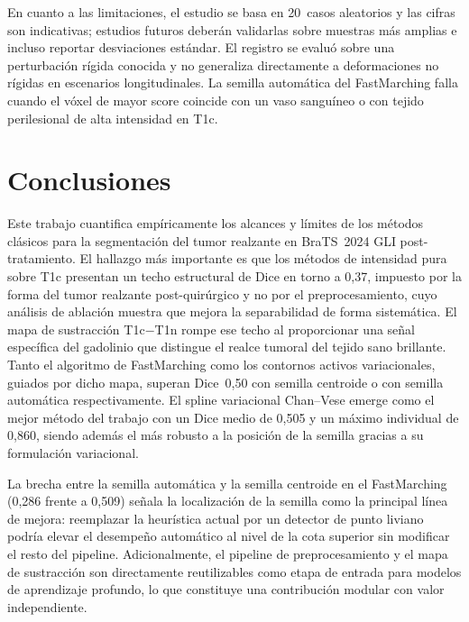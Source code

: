 \documentclass[conference]{IEEEtran}
\begin{document}
En cuanto a las limitaciones, el estudio se basa en 20~casos
aleatorios y las cifras son indicativas; estudios futuros
deber\'{a}n validarlas sobre muestras m\'{a}s amplias e incluso
reportar desviaciones est\'{a}ndar.
El registro se evalu\'{o} sobre una perturbaci\'{o}n r\'{i}gida
conocida y no generaliza directamente a deformaciones no
r\'{i}gidas en escenarios longitudinales.
La semilla autom\'{a}tica del FastMarching falla cuando el
v\'{o}xel de mayor score coincide con un vaso sangu\'{i}neo o con
tejido perilesional de alta intensidad en T1c.

\section{Conclusiones}

Este trabajo cuantifica emp\'{i}ricamente los alcances y
l\'{i}mites de los m\'{e}todos cl\'{a}sicos para la segmentaci\'{o}n
del tumor realzante en BraTS~2024 GLI post-tratamiento.
El hallazgo m\'{a}s importante es que los m\'{e}todos de intensidad
pura sobre T1c presentan un techo estructural de Dice en torno
a 0,37, impuesto por la forma del tumor realzante post-quir\'{u}rgico
y no por el preprocesamiento, cuyo an\'{a}lisis de ablaci\'{o}n
muestra que mejora la separabilidad de forma sistem\'{a}tica.
El mapa de sustracci\'{o}n T1c$-$T1n rompe ese techo al proporcionar
una se\~{n}al espec\'{i}fica del gadolinio que distingue el realce
tumoral del tejido sano brillante.
Tanto el algoritmo de FastMarching como los contornos activos
variacionales, guiados por dicho mapa, superan Dice~0,50 con
semilla centroide o con semilla autom\'{a}tica respectivamente.
El spline variacional Chan--Vese emerge como el mejor m\'{e}todo
del trabajo con un Dice medio de 0,505 y un m\'{a}ximo individual
de 0,860, siendo adem\'{a}s el m\'{a}s robusto a la posici\'{o}n
de la semilla gracias a su formulaci\'{o}n variacional.

La brecha entre la semilla autom\'{a}tica y la semilla centroide
en el FastMarching (0,286 frente a 0,509) se\~{n}ala la
localizaci\'{o}n de la semilla como la principal l\'{i}nea de mejora:
reemplazar la heur\'{i}stica actual por un detector de punto
liviano podr\'{i}a elevar el desempe\~{n}o autom\'{a}tico al nivel
de la cota superior sin modificar el resto del pipeline.
Adicionalmente, el pipeline de preprocesamiento y el mapa de
sustracci\'{o}n son directamente reutilizables como etapa de
entrada para modelos de aprendizaje profundo, lo que constituye
una contribuci\'{o}n modular con valor independiente.
\end{document}

